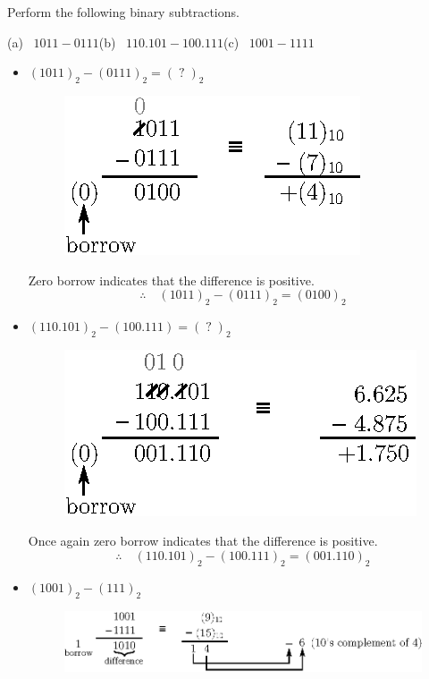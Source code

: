 \begin{example}\label{exam6.15}
Perform the following binary subtractions.
\begin{center}
(a)~ $1011-0111$\qquad (b)~ $110.101-100.111$\qquad (c)~ $1001-1111$
\end{center}
\end{example}

\begin{solution}
\begin{itemize}
\item[(a)] $(1011)_{2}-(0111)_{2}=(\;?\;)_{2}$
\begin{figure}[H]
\centering
\includegraphics[scale=1.1]{chap6/fig49.eps}
\end{figure}

Zero borrow indicates that the difference is positive.
$$
\therefore\quad (1011)_{2}-(0111)_{2}=(0100)_{2}
$$

\eject

\item[(b)] $(110.101)_{2}-(100.111)=(\;?\;)_{2}$
\begin{figure}[H]
\centering
\includegraphics[scale=1.1]{chap6/fig50.eps}
\end{figure}

Once again zero borrow indicates that the difference is positive.
$$
\therefore\quad (110.101)_{2}-(100.111)_{2}=(001.110)_{2}
$$

\item[(c)] $(1001)_{2}-(111)_{2}$
\begin{figure}[H]
\centering
\includegraphics[scale=1.1]{chap6/fig51.eps}
\end{figure}


\end{itemize}
\end{solution}
